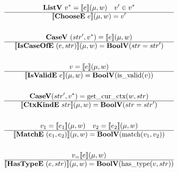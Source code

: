 \begin{gather*}
  \listv ~ \seq{v} = \sem{e}(\mu, w) \quad
  v' \in \seq{v} \\
  \hline
  \sem{\choosee ~ e}(\mu, w) = v' \\
%
\newline \\
  \casev ~ (str', \seq{v}) = \sem{e}(\mu, w) \\
  \hline
  \sem{\iscaseofe ~ (e, str)}(\mu, w) = \boolv (str = str') \\
%
\newline \\
  v = \sem{e}(\mu, w) \\
  \hline
  \sem{\isvalide ~ e}(\mu, w) = \boolv (\isvalid(v)) \\
%
\newline \\
  \casev (str', \seq v) = \getcurctx(w, str) \\
  \hline
  \sem{\ctxkinde ~ str}(\mu, w) = \boolv (str = str') \\
%
\newline \\
  v_1 = \sem{e_1}(\mu, w) \quad
  v_2 = \sem{e_2}(\mu, w) \\
  \hline
  \sem{\matche ~ (e_1, e_2)}(\mu, w) = \boolv (\match(v_1, v_2)) \\
%
\newline \\
  v_= \sem{e}(\mu, w) \\
  \hline
  \sem{\hastypee ~ (e, str)}(\mu, w) = \boolv (\hastype(v, str)) \\
\end{gather*}






